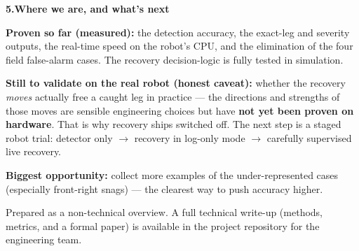 \documentclass[11pt]{article}
\newcommand{\heading}[1]{\vspace{4pt}\par{\large\bfseries #1}\par\vspace{-2pt}}
\begin{document}
\heading{5.\quad Where we are, and what's next}
\textbf{Proven so far (measured):} the detection accuracy, the exact-leg and severity outputs,
the real-time speed on the robot's CPU, and the elimination of the four field false-alarm
cases. The recovery decision-logic is fully tested in simulation.

\textbf{Still to validate on the real robot (honest caveat):} whether the recovery
\emph{moves} actually free a caught leg in practice --- the directions and strengths of those
moves are sensible engineering choices but have \textbf{not yet been proven on hardware}. That
is why recovery ships switched off. The next step is a staged robot trial: detector only
$\rightarrow$ recovery in log-only mode $\rightarrow$ carefully supervised live recovery.

\textbf{Biggest opportunity:} collect more examples of the under-represented cases (especially
front-right snags) --- the clearest way to push accuracy higher.

\vfill
{\footnotesize\color{soft} Prepared as a non-technical overview. A full technical write-up
(methods, metrics, and a formal paper) is available in the project repository for the
engineering team.}
\end{document}
